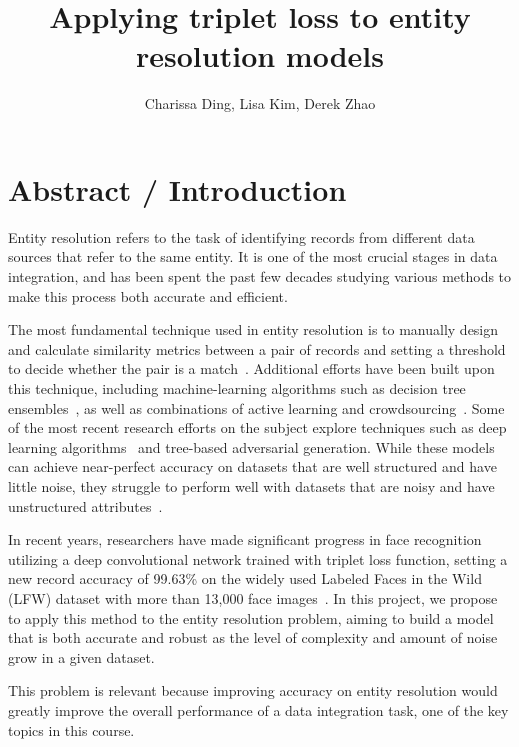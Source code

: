 \documentclass{proc}
\begin{document}
\title{Applying triplet loss to entity resolution models}

\author{Charissa Ding, Lisa Kim, Derek Zhao}

\maketitle

\section{Abstract / Introduction}

Entity resolution refers to the task of identifying records from different data sources that refer to the same entity. It is one of the most crucial stages in data integration, and has been spent the past few decades studying various methods to make this process both accurate and efficient.

The most fundamental technique used in entity resolution is to manually design and calculate similarity metrics between a pair of records and setting a threshold to decide whether the pair is a match~\cite{elmagarmid2007duplicate}. Additional efforts have been built upon this technique, including machine-learning algorithms such as decision tree ensembles~\cite{varma2017relic, yi2017method}, as well as combinations of active learning and crowdsourcing~\cite{gokhale2014corleone,wang2012crowder}. Some of the most recent research efforts on the subject explore techniques such as deep learning algorithms~\cite{ebraheem2017deeper} and tree-based adversarial generation. While these models can achieve near-perfect accuracy on datasets that are well structured and have little noise, they struggle to perform well with datasets that are noisy and have unstructured attributes~\cite{ebraheem2017deeper}.

In recent years, researchers have made significant progress in face recognition utilizing a deep convolutional network trained with triplet loss function, setting a new record accuracy of 99.63\% on the widely used Labeled Faces in the Wild (LFW) dataset with more than 13,000 face images~\cite{schroff2015facenet}. In this project, we propose to apply this method to the entity resolution problem, aiming to build a model that is both accurate and robust as the level of complexity and amount of noise grow in a given dataset.

This problem is relevant because improving accuracy on entity resolution would greatly improve the overall performance of a data integration task, one of the key topics in this course.
\end{document}
